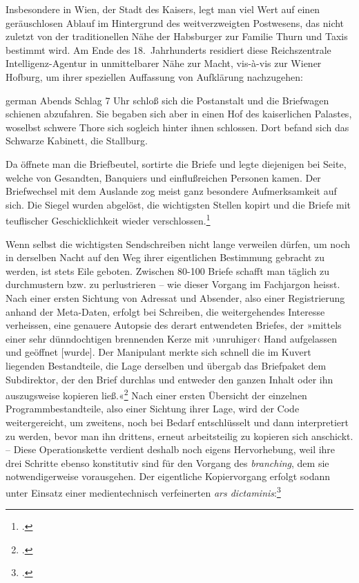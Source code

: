 \documentclass[a4paper,11pt]{article}
\newcommand{\anf}[1]{»#1«}
\newcommand{\inanf}[1]{›#1‹}
\newenvironment{zitat}{
\begin{foreigndisplayquote}{german}}%
{\end{foreigndisplayquote}}
\begin{document}
Insbesondere in Wien, der Stadt des Kaisers, legt man viel Wert auf einen geräuschlosen Ablauf im Hintergrund des weitverzweigten Postwesens, das nicht zuletzt von der traditionellen Nähe der Habsburger zur Familie Thurn und Taxis bestimmt wird. Am Ende des 18.~Jahrhunderts residiert diese Reichszentrale Intelligenz-Agentur in unmittelbarer Nähe zur Macht, vis-à-vis zur Wiener Hofburg, um ihrer speziellen Auffassung von Aufklärung nachzugehen:
\begin{zitat}
Abends Schlag 7 Uhr schloß sich die Postanstalt und die Briefwagen schienen abzufahren. Sie begaben sich aber in einen Hof des kaiserlichen Palastes, woselbst schwere Thore sich sogleich hinter ihnen schlossen. Dort befand sich das Schwarze Kabinett, die Stallburg.

Da öffnete man die Briefbeutel, sortirte die Briefe und legte diejenigen bei Seite, welche von Gesandten, Banquiers und einflußreichen Personen kamen. Der Briefwechsel mit dem Auslande zog meist ganz besondere Aufmerksamkeit auf sich. Die Siegel wurden abgelöst, die wichtigsten Stellen kopirt und die Briefe mit teuflischer Geschicklichkeit wieder verschlossen.\footcite[40]{koenig:1875}
\end{zitat}
Wenn selbst die wichtigsten Sendschreiben nicht lange verweilen dürfen, um noch in derselben Nacht auf den Weg ihrer eigentlichen Bestimmung gebracht zu werden, ist stets Eile geboten. Zwischen 80-100 Briefe schafft man täglich zu durchmustern bzw. zu perlustrieren – wie dieser Vorgang im Fachjargon heisst. Nach einer ersten Sichtung von Adressat und Absender, also einer Registrierung anhand der Meta-Daten, erfolgt bei Schreiben, die weitergehendes Interesse verheissen, eine genauere Autopsie des derart entwendeten Briefes, der \anf{mittels einer sehr dünndochtigen brennenden Kerze mit \inanf{unruhiger} Hand aufgelassen und geöffnet [wurde]. Der Manipulant merkte sich schnell die im Kuvert liegenden Bestandteile, die Lage derselben und übergab das Briefpaket dem Subdirektor, der den Brief durchlas und entweder den ganzen Inhalt oder ihn auszugsweise kopieren ließ.}\footcite[138]{stix:1937} Nach einer ersten Übersicht der einzelnen Programmbestandteile, also einer Sichtung ihrer Lage, wird der Code weitergereicht, um zweitens, noch bei Bedarf entschlüsselt und dann interpretiert zu werden, bevor man ihn drittens, erneut arbeitsteilig zu kopieren sich anschickt. – Diese Operationskette verdient deshalb noch eigens Hervorhebung, weil ihre drei Schritte ebenso konstitutiv sind für den Vorgang des \emph{branching}, dem sie notwendigerweise vorausgehen. Der eigentliche Kopiervorgang erfolgt sodann unter Einsatz einer medientechnisch verfeinerten \emph{ars dictaminis}:\footcite[Vgl. dazu][]{krautter:1982}
\end{document}
